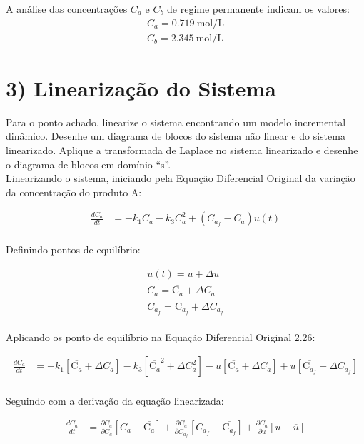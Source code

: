 \documentclass[a4paper,12pt]{report}
\begin{document}
  A análise das concentrações \( C_a \) e \( C_b \) de regime permanente indicam os valores:\\
\begin{align}
 C_a = 0.719 \ \text{mol/L}\\
 C_b = 2.345 \ \text{mol/L}
\end{align}

\newpage

\section{3) Linearização do Sistema}

Para o ponto achado, linearize o sistema encontrando um modelo incremental dinâmico. Desenhe um diagrama de blocos do sistema não linear e do sistema linearizado. Aplique a transformada de Laplace no sistema linearizado e desenhe o diagrama de blocos em domínio “s”.\\

Linearizando o sistema, iniciando pela Equação Diferencial Original da variação da concentração do produto A:

\begin{align}
\frac{dC_a}{dt} &= -k_1 C_a - k_3 C_a^2 + (C_{a_f}-C_a) u(t)\\
\end{align}

Definindo pontos de equilíbrio:

\begin{align}
u(t) = \overline{u} + \Delta{u}\\
C_a = \overline{\mathrm{C}_a} + \Delta{C}_a\\
C_{a_f} = \overline{\mathrm{C}_{a_f}} + \Delta{C}_{a_f}\\
\end{align}

Aplicando os ponto de equilíbrio na Equação Diferencial Original 2.26:

\begin{align}
\frac{dC_a}{dt} &= -k_1 [ \overline{\mathrm{C}_a} + \Delta{C}_a] - k_3 [\overline{\mathrm{C}_a}^2 + \Delta{C}_a^2] - u [\overline{\mathrm{C}_a} + \Delta{C}_a] + u [\overline{\mathrm{C}_{a_f}} + \Delta{C}_{a_f}]\\
\end{align}

Seguindo com a derivação da equação linearizada:

\begin{align}
\frac{dC_a}{dt} &= \frac{\partial C_a}{\partial C_a}[C_a-\overline{\mathrm{C}_a}] + \frac{\partial C_a}{\partial C_{a_f}}[C_{a_f}-\overline{\mathrm{C}_{a_f}}] + \frac{\partial C_a}{\partial u}[u-\overline{u}]
\end{align}
\end{document}
